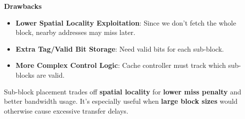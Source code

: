 \highspace
\begin{flushleft}
    \textcolor{Red2}{ \textbf{Drawbacks}}
\end{flushleft}
\begin{itemize}
    \item[\textcolor{Red2}{\faIcon{times}}] \textbf{Lower Spatial Locality Exploitation}: Since we don't fetch the whole block, nearby addresses may miss later.
    \item[\textcolor{Red2}{\faIcon{times}}] \textbf{Extra Tag/Valid Bit Storage}: Need valid bits for each sub-block.
    \item[\textcolor{Red2}{\faIcon{times}}] \textbf{More Complex Control Logic}: Cache controller must track which sub-blocks are valid.
\end{itemize}

\highspace
Sub-block placement trades off \textbf{spatial locality} for \textbf{lower miss penalty} and better bandwidth usage. It's especially useful when \textbf{large block sizes} would otherwise cause excessive transfer delays.
